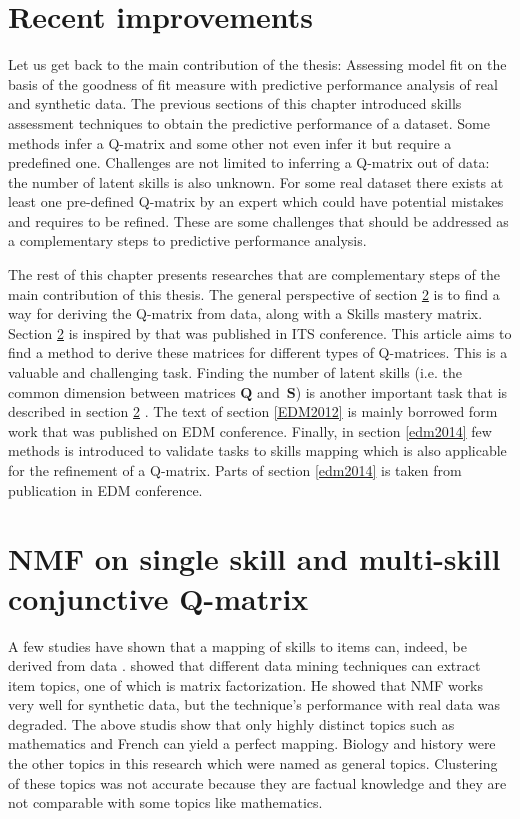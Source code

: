 \section{Recent improvements}

Let us get back to the main contribution of the thesis:  Assessing model fit on the basis of the goodness of fit measure with predictive performance analysis of real and synthetic data. The previous sections of this chapter introduced skills assessment techniques to obtain the predictive performance of a dataset. Some methods infer a Q-matrix and some other not even infer it but require a predefined one. Challenges are not limited to inferring a Q-matrix out of data: the number of latent skills is also unknown. For some real dataset there exists at least one pre-defined Q-matrix  by an expert which could have potential mistakes and requires to be refined. These are some challenges that should be addressed as a complementary steps to predictive performance analysis.

The rest of this chapter presents researches that are complementary steps of the main contribution of this thesis. The general perspective of section \ref{ITS2012} is to find a way for deriving the Q-matrix from data, along with a Skills mastery matrix. Section \ref{ITS2012} is inspired by \citet{desmarais2012mapping} that was published in ITS conference. This article aims to find a method to derive these matrices for different types of Q-matrices. This is a valuable and challenging task. Finding the number of latent skills (i.e. the common dimension between matrices $\mathbf{Q}$ and~$\mathbf{S}$) is another important task that is described in section \ref{ITS2012} . The text of section \ref{EDM2012} is mainly borrowed form \citet{Beheshti2012Numbers} work that was published on EDM conference. Finally, in section \ref{edm2014} few methods is introduced to validate tasks to skills mapping which is also applicable for the refinement of a Q-matrix. Parts of section \ref{edm2014} is taken from \citet{desmarais2014refinement} publication in EDM conference.


\section{NMF on single skill and multi-skill conjunctive Q-matrix}
\label{ITS2012}

A few studies have shown that a mapping of skills to items can, indeed, be derived from data \citep{winters2006,desmarais2011conditions}. \citet{Winters2006} showed that different data mining techniques can extract item topics, one of which is matrix factorization. He showed that NMF works very well for synthetic data, but the technique's performance with real data was degraded. The above studis show that only highly distinct topics such as mathematics and French can yield a perfect mapping. Biology and history were the other topics in this research which were named as general topics. Clustering of these topics was not accurate because they are factual knowledge and they are not comparable with some topics like mathematics.

